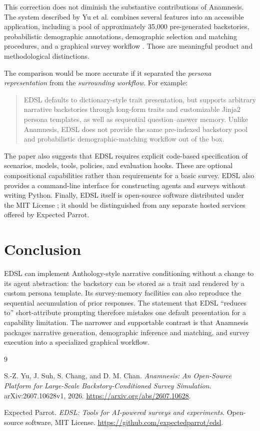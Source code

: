 \documentclass[11pt]{article}
\begin{document}
This correction does not diminish the substantive contributions of
Anamnesis. The system described by Yu et al. combines several features into an
accessible application, including a pool of approximately 35,000 pre-generated
backstories, probabilistic demographic annotations, demographic selection and
matching procedures, and a graphical survey workflow \cite{yu2026anamnesis}.
Those are meaningful product and methodological distinctions.

The comparison would be more accurate if it separated the \emph{persona
representation} from the \emph{surrounding workflow}. For example:

\begin{quote}
EDSL defaults to dictionary-style trait presentation, but supports arbitrary
narrative backstories through long-form traits and customizable Jinja2 persona
templates, as well as sequential question--answer memory. Unlike Anamnesis,
EDSL does not provide the same pre-indexed backstory pool and probabilistic
demographic-matching workflow out of the box.
\end{quote}

The paper also suggests that EDSL requires explicit code-based specification
of scenarios, models, tools, policies, and evaluation hooks. These are optional
compositional capabilities rather than requirements for a basic survey. EDSL
also provides a command-line interface for constructing agents and surveys
without writing Python. Finally, EDSL itself is open-source software distributed
under the MIT License \cite{edsl}; it should be distinguished from any separate
hosted services offered by Expected Parrot.

\section{Conclusion}

EDSL can implement Anthology-style narrative conditioning without a change to
its agent abstraction: the backstory can be stored as a trait and rendered by
a custom persona template. Its survey-memory facilities can also reproduce
the sequential accumulation of prior responses. The statement that EDSL
``reduces to'' short-attribute prompting therefore mistakes one default
presentation for a capability limitation. The narrower and supportable contrast
is that Anamnesis packages narrative generation, demographic inference and
matching, and survey execution into a specialized graphical workflow.

\begin{thebibliography}{9}

S.-Z. Yu, J. Suh, S. Chang, and D. M. Chan.
\newblock \emph{Anamnesis: An Open-Source Platform for Large-Scale
Backstory-Conditioned Survey Simulation}.
\newblock arXiv:2607.10628v1, 2026.
\newblock \url{https://arxiv.org/abs/2607.10628}.

Expected Parrot.
\newblock \emph{EDSL: Tools for AI-powered surveys and experiments}.
\newblock Open-source software, MIT License.
\newblock \url{https://github.com/expectedparrot/edsl}.

\end{thebibliography}
\end{document}
